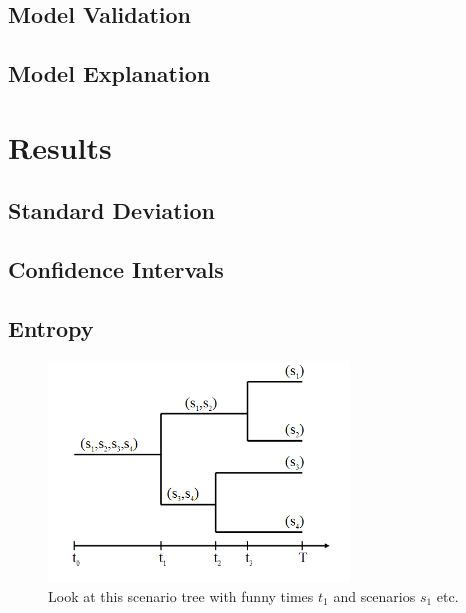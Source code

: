 \documentclass[11pt,twoside]{article}
\numberwithin{Theorem}{section}
\numberwithin{Definition}{section}
\numberwithin{Lemma}{section}
\numberwithin{Algorithm}{section}
\numberwithin{equation}{section}
\begin{document}
\subsection{Model Validation}
\label{sec:validation}
\blindtext

\subsection{Model Explanation}
\label{sec:explanation}
\blindtext

\clearpage

\section{Results}
\label{sec:results}
\blindtext

\subsection{Standard Deviation}
\blindtext

\subsection{Confidence Intervals}
\blindtext

\subsection{Entropy}
\begin{figure}[!ht]
\centering
\includegraphics[width=8cm]{scenTree.png}
\caption{Look at this scenario tree with funny times $t_{1}$ and scenarios $s_{1}$ etc.}
\label{fig:scenarioTree}
\end{figure}

\cleardoublepage

\end{document}
